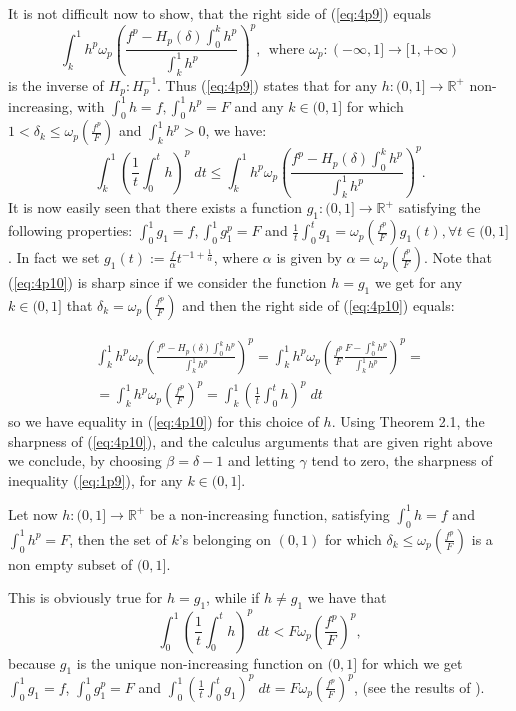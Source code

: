 \documentclass{article}
\numberwithin{equation}{section}
\theoremstyle{definition}
\theoremstyle{remark}
\begin{document}
It is not difficult now to show, that the right side of (\ref{eq:4p9}) equals
\[
\int_k^1 h^p \omega_p \left(\frac{f^p-H_{p}(\delta) \int_0^k h^p }{\int_k^1 h^p}\right)^p, \ \ \text{where } \omega_p:(-\infty,1]\longrightarrow [1,+\infty)
\]
is the inverse of $H_p: H_p^{-1}$. Thus (\ref{eq:4p9}) states that for any $h:(0,1]\longrightarrow\mathbb{R}^{+}$ non-increasing, with $\int_0^1 h = f, \int_0^1 h^p = F$ and any $k\in(0,1]$ for which $1<\delta_k\leq \omega_p \left(\frac{f^p}{F} \right)$ and $\int_k^1 h^p > 0$, we have:
\begin{equation}\label{eq:4p10}
\int_k^1 \left( \frac{1}{t} \int_0^t h \right)^p \;dt \leq \int_k^1 h^p \omega_p \left(\frac{f^p-H_{p}(\delta) \int_0^k h^p }{\int_k^1 h^p}\right)^p.
\end{equation}
It is now easily seen that there exists a function $g_1:(0,1]\rightarrow\mathbb{R}^+$ satisfying the following properties:
$\int_0^1 g_1 = f, \int_0^1 g_1^p = F$ and $\frac{1}{t} \int_0^t g_1=\omega_p \left(\frac{f^p}{F} \right)g_1(t), \forall t\in(0,1]$. In fact we set $g_1(t):=\frac{f}{\alpha}t^{-1+\frac{1}{\alpha}}$, where $\alpha$ is given by $\alpha=\omega_p \left(\frac{f^p}{F}\right)$. 
Note that (\ref{eq:4p10}) is sharp since if we consider the function $h=g_1$ we get for any $k\in(0,1]$ that $\delta_k=\omega_p \left(\frac{f^p}{F} \right)$ and then the right side of (\ref{eq:4p10}) equals:

\begin{multline*}
\int_k^1 h^p \omega_p  \left( \frac{f^p-H_{p}(\delta) \int_0^k h^p }{\int_k^1 h^p} \right)^p
=\int_k^1 h^p \omega_p  \left( \frac{f^p}{F}\frac{ F-\int_0^k h^p }{\int_k^1 h^p} \right)^p=\\
=\int_k^1 h^p \omega_p\left(\frac{f^p}{F} \right)^p=\int_k^1 \left(\frac{1}{t} \int_0^t h \right)^p\; dt
\end{multline*}
so we have equality in (\ref{eq:4p10}) for this choice of $h$. Using Theorem 2.1, the sharpness of (\ref{eq:4p10}), and the calculus arguments that are given right above we conclude, by choosing $\beta=\delta-1$ and letting $\gamma$ tend to zero, the sharpness of inequality (\ref{eq:1p9}), for any $k\in(0,1]$.

Let now $h:(0,1]\longrightarrow\mathbb{R}^{+}$ be a non-increasing function, satisfying $\int_0^1 h = f$ and $ \int_0^1 h^p = F$, then the set of $k$'s belonging on $(0,1)$ for which $\delta_k\leq \omega_p \left(\frac{f^p}{F} \right)$ is a non empty subset of $(0,1]$.

This is obviously true for $h=g_1$, while if $h\neq g_1$ we have that $$\int_0^1 \left(\frac{1}{t} \int_0^t h \right)^p\; dt < F \omega_p \left(\frac{f^p}{F} \right)^p,$$ because $g_1$ is the unique non-increasing function on $(0,1]$ for which we get $\int_0^1 g_1 = f$, $\int_0^1 g_1^p = F$ and $\int_0^1 \left( \frac{1}{t} \int_0^t g_1 \right)^p \;dt = F \omega_p \left(\frac{f^p}{F} \right)^p$, (see the results of \cite{N8}).
\end{document}
